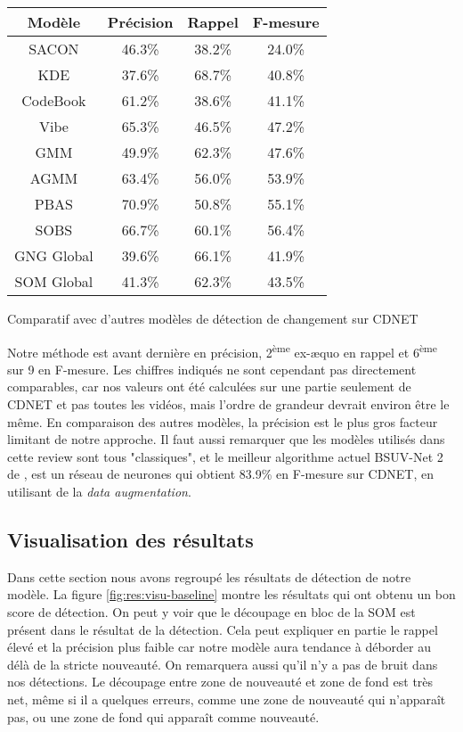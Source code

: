 	\begin{tableth}
    \begin{tabular}{|c|ccc|}
		\hline
		Modèle & Précision & Rappel & F-mesure\\
		\hline
		SACON & 46.3\% & 38.2\% & 24.0\%\\
		KDE & 37.6\% & 68.7\% & 40.8\%\\
		CodeBook & 61.2\% & 38.6\% & 41.1\% \\
		Vibe & 65.3\% & 46.5\% & 47.2\% \\
		GMM & 49.9\% & 62.3\% & 47.6\% \\
		AGMM & 63.4\% & 56.0\% & 53.9\% \\
		PBAS & 70.9\% & 50.8\% & 55.1\% \\
		SOBS & 66.7\% & 60.1\% & 56.4\% \\
		\hline
		GNG Global & 39.6\% & 66.1\% & 41.9\% \\
		SOM Global & 41.3\% & 62.3\% & 43.5\% \\
		\hline
	\end{tabular}
	\caption{Comparatif avec d'autres modèles de détection de changement sur CDNET}
	\label{tab:res:compare}
	\end{tableth}

	Notre méthode est avant dernière en précision, 2\textsuperscript{ème} ex-æquo en rappel et 6\textsuperscript{ème} sur 9 en F-mesure. Les chiffres indiqués ne sont cependant pas directement comparables, car nos valeurs ont été calculées sur une partie seulement de CDNET et pas toutes les vidéos, mais l'ordre de grandeur devrait environ être le même. En comparaison des autres modèles, la précision est le plus gros facteur limitant de notre approche. Il faut aussi remarquer que les modèles utilisés dans cette review sont tous "classiques", et le meilleur algorithme actuel BSUV-Net 2 de \cite{tezcan2021bsuv}, est un réseau de neurones qui obtient 83.9\% en F-mesure sur CDNET, en utilisant de la \textit{data augmentation}.

	\subsection{Visualisation des résultats}
	
	Dans cette section nous avons regroupé les résultats de détection de notre modèle. La figure \ref{fig:res:visu-baseline} montre les résultats qui ont obtenu un bon score de détection. On peut y voir que le découpage en bloc de la SOM est présent dans le résultat de la détection. Cela peut expliquer en partie le rappel élevé et la précision plus faible car notre modèle aura tendance à déborder au délà de la stricte nouveauté. On remarquera aussi qu'il n'y a pas de bruit dans nos détections. Le découpage entre zone de nouveauté et zone de fond est très net, même si il a quelques erreurs, comme une zone de nouveauté qui n'apparaît pas, ou une zone de fond qui apparaît comme nouveauté.

